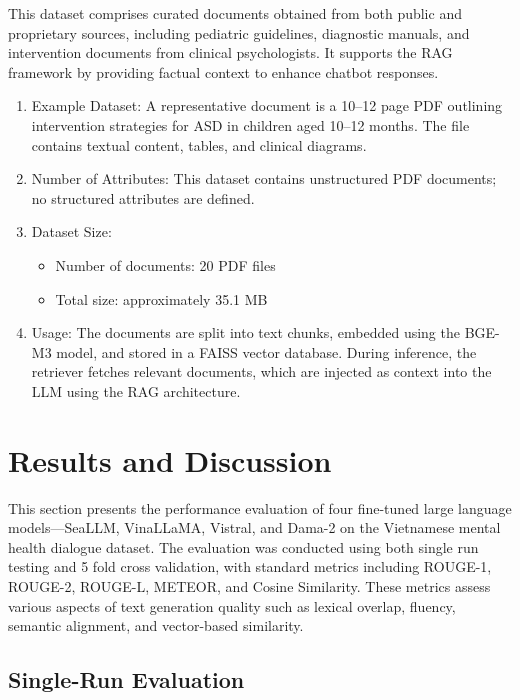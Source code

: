 \documentclass[runningheads]{llncs}
\begin{document}
This dataset comprises curated documents obtained from both public and proprietary sources, including pediatric guidelines, diagnostic manuals, and intervention documents from clinical psychologists. It supports the RAG framework by providing factual context to enhance chatbot responses.
\begin{enumerate}[label=(\alph*)]
\item Example Dataset: 
A representative document is a 10–12 page PDF outlining intervention strategies for ASD in children aged 10–12 months. The file contains textual content, tables, and clinical diagrams.

\item Number of Attributes: 
This dataset contains unstructured PDF documents; no structured attributes are defined.

\item Dataset Size: 
\begin{itemize}
    \item Number of documents: 20 PDF files
    \item Total size: approximately 35.1 MB
\end{itemize}

\item Usage: 
The documents are split into text chunks, embedded using the BGE-M3 model, and stored in a FAISS vector database. During inference, the retriever fetches relevant documents, which are injected as context into the LLM using the RAG architecture.
\end{enumerate}

\section{Results and Discussion}
\label{sec:results-discussion}

This section presents the performance evaluation of four fine-tuned large language models—SeaLLM, VinaLLaMA, Vistral, and Dama-2 on the Vietnamese mental health dialogue dataset. The evaluation was conducted using both single run testing and 5 fold cross validation, with standard metrics including ROUGE-1, ROUGE-2, ROUGE-L, METEOR, and Cosine Similarity. These metrics assess various aspects of text generation quality such as lexical overlap, fluency, semantic alignment, and vector-based similarity.

\subsection{Single-Run Evaluation}
\end{document}
